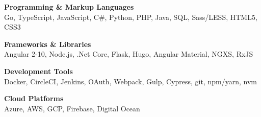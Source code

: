 

\begin{cvparagraph}

    \textbf{Programming \& Markup Languages}\\
    Go, TypeScript, JavaScript, C\#, Python, PHP, Java, SQL, Sass/LESS, HTML5, CSS3

    \textbf{Frameworks \& Libraries}\\
    Angular 2-10, Node.js, .Net Core, Flask, Hugo, Angular Material, NGXS, RxJS

    \textbf{Development Tools}\\
    Docker, CircleCI, Jenkins, OAuth, Webpack, Gulp, Cypress, git, npm/yarn, nvm

    \textbf{Cloud Platforms}\\
    Azure, AWS, GCP, Firebase, Digital Ocean
\end{cvparagraph}
